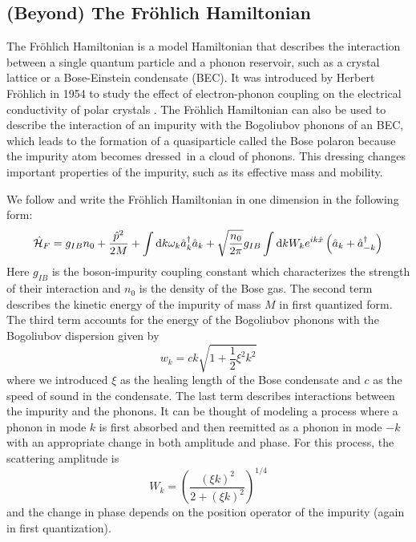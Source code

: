 \subsection{(Beyond) The Fröhlich Hamiltonian}\label{(Beyond) The Fröhlich Hamiltonian}
The Fröhlich Hamiltonian is a model Hamiltonian that describes the interaction between a single quantum particle and a phonon reservoir, such as a crystal lattice or a Bose-Einstein condensate (BEC). It was introduced by Herbert Fröhlich in 1954 to study the effect of electron-phonon coupling on the electrical conductivity of polar crystals \cite{doi:10.1080/00018735400101213}. The Fröhlich Hamiltonian can also be used to describe the interaction of an impurity with the Bogoliubov phonons of an BEC, which leads to the formation of a quasiparticle called the Bose polaron because the impurity atom becomes \grqq dressed\grqq\ in a cloud of phonons. This dressing changes important properties of the impurity, such as its effective mass and mobility.\par 
We follow \cite{Grusdt_2017} and write the Fröhlich Hamiltonian in one dimension in the following form:
\begin{equation}\label{Fröhlich}
\hat{\mathcal{H}}_F = g_{IB}n_0+\frac{\hat p^2}{2M}+\int\mathrm d k\omega_{ k}\hat a^\dagger_{ k}\hat a_{ k}+\sqrt{\frac{n_0}{2\pi}}g_{IB}\int\mathrm d k W_k e^{ik\hat x}\left(\hat a_{ k}+\hat a^\dagger_{- k}\right)
\end{equation}
Here $g_{IB}$ is the boson-impurity coupling constant which characterizes the strength of their interaction and $n_0$ is the density of the Bose gas. The second term describes the kinetic energy of the impurity of mass $M$ in first quantized form. The third term accounts for the energy of the Bogoliubov phonons with the Bogoliubov dispersion given by 
\begin{equation}\label{bog_disp}
w_k=ck\sqrt{1+\frac12\xi^2k^2}
\end{equation}
where we introduced $\xi$ as the healing length of the Bose condensate and $c$ as the speed of sound in the condensate. The last term describes interactions between the impurity and the phonons. It can be thought of modeling a process where a phonon in mode $k$ is first absorbed and then reemitted as a phonon in mode $-k$ with an appropriate change in both amplitude and phase. For this process, the scattering amplitude is
\begin{equation}\label{W_k_def}
W_k = \left(\frac{(\xi k)^2}{2+(\xi k)^2}\right)^{1/4}
\end{equation}
and the change in phase depends on the position operator of the impurity (again in first quantization).\par
